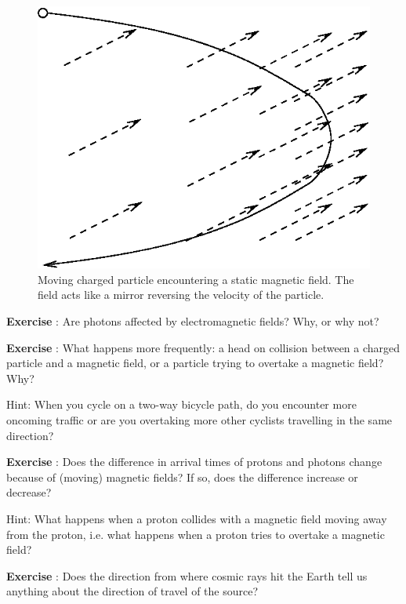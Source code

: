 \documentclass[12pt,a4paper]{article}
\numberwithin{equation}{section}
\numberwithin{figure}{section}
\newcounter{Exercise}
\numberwithin{table}{section}
\begin{document}
\begin{figure}\begin{center}
\includegraphics[scale=1]{field.eps}%
\caption{Moving charged particle encountering a static magnetic field. The field acts like a mirror reversing the velocity of the particle.}\label{fig:field}
\end{center}\end{figure}

\begin{shaded}
\textbf{Exercise \theExercise {}} : Are photons affected by electromagnetic fields? Why, or why not?\end{shaded}
\begin{shaded}
\textbf{Exercise \theExercise {}} : What happens more frequently: a head on collision between a charged particle and a magnetic field, or a particle trying to overtake a magnetic field? Why?

Hint: When you cycle on a two-way bicycle path, do you encounter more oncoming traffic or are you overtaking more other cyclists travelling in the same direction?
\end{shaded}
\begin{shaded}
\textbf{Exercise \theExercise {}} : Does the difference in arrival times of protons and photons change because of (moving) magnetic fields? If so, does the difference increase or decrease?

Hint: What happens when a proton collides with a magnetic field moving away from the proton, i.e. what happens when a proton tries to overtake a magnetic field?\end{shaded}
\begin{shaded}
\textbf{Exercise \theExercise {}} : Does the direction from where cosmic rays hit the Earth tell us anything about the direction of travel of the source?\end{shaded}
\end{document}
